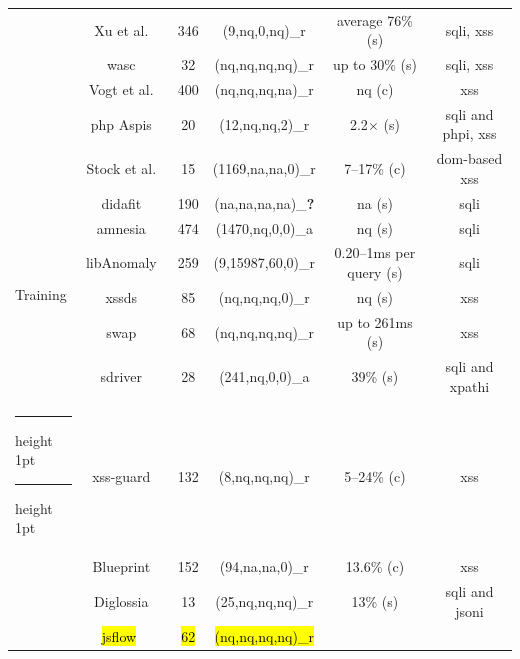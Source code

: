 \documentclass[10pt,journal,compsoc]{IEEEtran}
\makeatletter
\newcommand{\hlc}[2][yellow]{ {\sethlcolor{#1} \hl{#2}} }
\newcommand{\tick}{\ding{52}}
\newcommand{\xmark}{\ding{56}}
\newcommand{\thickhline}{%
    \noalign {\ifnum 0=`}\fi \hrule height 1pt
    \futurelet \reserved@a \@xhline
}
\makeatother
\begin{document}
\begin{table}[t]
\begin{threeparttable}
\begin{small}
{\begin{tabular}{l|c|c|cc|c}
  &   Xu et al.~\cite{XBS06} & 346 & (9,{\sc nq},0,{\sc nq})\_r & average 76\% ({\sc s}) & {\sc sql}i, {\sc xss} \\ 
  &   {\sc wasc}~\cite{NLC07} & 32 & ({\sc nq},{\sc nq},{\sc nq},{\sc nq})\_r & up to 30\% ({\sc s}) & {\sc sql}i, {\sc xss} \\
  &   Vogt et al.~\cite{VFJKKV07} & 400 & ({\sc nq},{\sc nq},{\sc nq},{\sc na})\_r & {\sc nq} ({\sc c}) & {\sc xss} \\
  &   {\sc php} Aspis~\cite{PMP11} & 20 & (12,{\sc nq},{\sc nq},2)\_r & 2.2$\times$ ({\sc s}) & {\sc sql}i and {\sc php}i, {\sc xss} \\
  &   Stock et al.~\cite{SLMS14} & 15 & (1169,{\sc na},{\sc na},0)\_r & 7--17\% ({\sc c}) & {\sc dom}-based {\sc xss} \\
  \hline 
  \multirow{6}{*}{Training}
  &   {\sc didafit}~\cite{LLW02} & 190 & ({\sc na},{\sc na},{\sc na},{\sc na})\_{\bf ?} & {\sc na} ({\sc s}) & {\sc sql}i \\
  &   {\sc amnesia}~\cite{HO05b} & 474 & (1470,{\sc nq},0,0)\_a & {\sc nq} ({\sc s}) & {\sc sql}i \\ 
  &   libAnomaly~\cite{VMV05} & 259 & (9,15987,60,0)\_r & 0.20--1ms per query ({\sc s}) & {\sc sql}i \\
  &   {\sc xssds}~\cite{JEP08} & 85 & ({\sc nq},{\sc nq},{\sc nq},0)\_r & {\sc nq} ({\sc s}) & {\sc xss} \\
  &   {\sc swap}~\cite{WPLKK09} & 68 & ({\sc nq},{\sc nq},{\sc nq},{\sc nq})\_r & up to 261ms ({\sc s}) & {\sc xss} \\ 
  &   {\sc sd}river~\cite{MS09,MKLS11} & 28 & (241,{\sc nq},0,0)\_a & 39\% ({\sc s}) & {\sc sql}i and {\sc xp}athi \\
  \thickhline
  \thickhline
  \multirow{9}{*}{Hybrid}
  &   {\sc xss-guard}~\cite{BV08} & 132 & (8,{\sc nq},{\sc nq},{\sc nq})\_r & 5--24\% ({\sc c}) & {\sc xss} \\
  &   Blueprint~\cite{LV09} & 152 & (94,{\sc na},{\sc na},0)\_r & 13.6\% ({\sc c}) & {\sc xss} \\
  &   Diglossia~\cite{SMS13} & 13 & (25,{\sc nq},{\sc nq},{\sc nq})\_r & 13\% ({\sc s}) & {\sc sql}i and {\sc json}i \\
  &   \hlc[yellow]{{\sc jsf}low}~\cite{HBBS14} & \hlc[yellow]{62} & \hlc[yellow]{({\sc nq},{\sc nq},{\sc nq},{\sc nq})\_r}

\end{tabular}}
\end{small}
\end{threeparttable}
\end{table}
\end{document}
